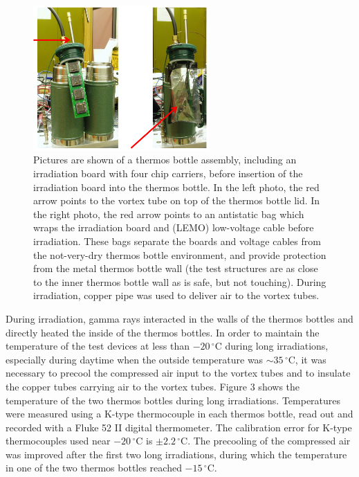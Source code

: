 \begin{figure}
\begin{center}
\includegraphics[width=0.6\textwidth]{thermos.pdf}
\caption{Pictures are shown of a thermos bottle assembly, including an irradiation board with
four chip carriers, before insertion of the irradiation board into the thermos bottle.
In the left photo, the red arrow points to the vortex tube\cite{vortex} on top of the thermos bottle lid. In the right photo, the red arrow points to an antistatic bag which wraps
the irradiation board and (LEMO) low-voltage cable before irradiation. These
bags separate the boards and voltage cables from the not-very-dry thermos bottle 
environment, and provide protection from the metal thermos bottle wall (the test structures
are as close to the inner thermos bottle wall as is safe, but not touching).  During irradiation, copper pipe was used to deliver air to the vortex tubes.}
\label{fig:thermos}
\end{center}
\end{figure}

During irradiation, gamma rays interacted in the walls of the thermos bottles and directly heated the inside of the thermos bottles.  In order to maintain the temperature of the test devices at less than $-20\,^{\circ}$C during long irradiations, especially during daytime when the outside temperature was $\sim35\,^{\circ}$C, it was necessary to precool the compressed air input to the vortex tubes and to insulate the copper tubes carrying air to the vortex tubes.  Figure 3 shows the temperature of the two thermos bottles during long irradiations.
Temperatures were measured using a K-type thermocouple in each thermos bottle, read out and recorded with a Fluke 52 II digital thermometer\cite{Fluke52}.  The calibration error for K-type thermocouples used near $-20\,^{\circ}$C is $\pm 2.2\,^{\circ}$C\cite{typeK}.
The precooling of the compressed air was improved after the first two long irradiations, during which the temperature in one of the two thermos bottles reached $-15\,^{\circ}$C.

